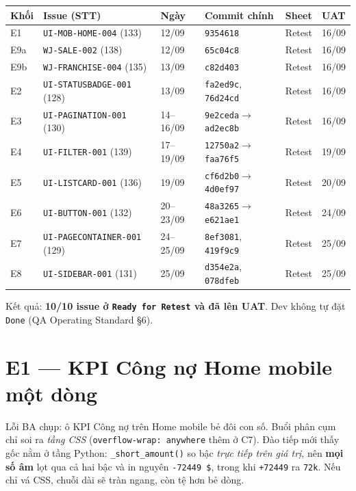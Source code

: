 \begin{center}
\small
\begin{tabular}{llllll}
\toprule
Khối & Issue (STT) & Ngày & Commit chính & Sheet & UAT \\
\midrule
E1  & \texttt{UI-MOB-HOME-004} (133)     & 12/09 & \texttt{9354618} & Retest & 16/09 \\
E9a & \texttt{WJ-SALE-002} (138)         & 12/09 & \texttt{65c04c8} & Retest & 16/09 \\
E9b & \texttt{WJ-FRANCHISE-004} (135)    & 13/09 & \texttt{c82d403} & Retest & 16/09 \\
E2  & \texttt{UI-STATUSBADGE-001} (128)  & 13/09 & \texttt{fa2ed9c}, \texttt{76d24cd} & Retest & 16/09 \\
E3  & \texttt{UI-PAGINATION-001} (130)   & 14--16/09 & \texttt{9e2ceda}$\to$\texttt{ad2ec8b} & Retest & 16/09 \\
E4  & \texttt{UI-FILTER-001} (139)       & 17--19/09 & \texttt{12750a2}$\to$\texttt{faa76f5} & Retest & 19/09 \\
E5  & \texttt{UI-LISTCARD-001} (136)     & 19/09 & \texttt{cf6d2b0}$\to$\texttt{4d0ef97} & Retest & 20/09 \\
E6  & \texttt{UI-BUTTON-001} (132)       & 20--23/09 & \texttt{48a3265}$\to$\texttt{e621ae1} & Retest & 24/09 \\
E7  & \texttt{UI-PAGECONTAINER-001} (129)& 24--25/09 & \texttt{8ef3081}, \texttt{419f9c9} & Retest & 25/09 \\
E8  & \texttt{UI-SIDEBAR-001} (131)      & 25/09 & \texttt{d354e2a}, \texttt{078dfeb} & Retest & 25/09 \\
\bottomrule
\end{tabular}
\end{center}

Kết quả: \textbf{10/10 issue ở \texttt{Ready for Retest} và đã lên UAT}. Dev không tự đặt
\texttt{Done} (QA Operating Standard §6).

\section{E1 --- KPI Công nợ Home mobile một dòng}

Lỗi BA chụp: ô KPI Công nợ trên Home mobile bẻ đôi con số. Buổi phân cụm chỉ soi ra \emph{tầng CSS}
(\texttt{overflow-wrap: anywhere} thêm ở C7). Đào tiếp mới thấy gốc nằm ở tầng Python:
\texttt{\_short\_amount()} so bậc \emph{trực tiếp trên giá trị}, nên \textbf{mọi số âm} lọt qua cả hai bậc
và in nguyên \texttt{-72449 \$}, trong khi \texttt{+72449} ra \texttt{72k}. Nếu chỉ vá CSS, chuỗi dài sẽ tràn
ngang, còn tệ hơn bẻ dòng.

